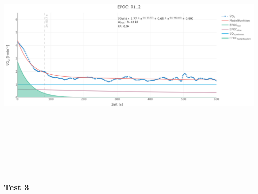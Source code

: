\documentclass[
  letterpaper,
  DIV=11]{scrartcl}
\begin{document}
\includegraphics[width=11.45833in,height=4.6875in]{images/01_2.png}

\subsubsection{Test 3}
\end{document}
